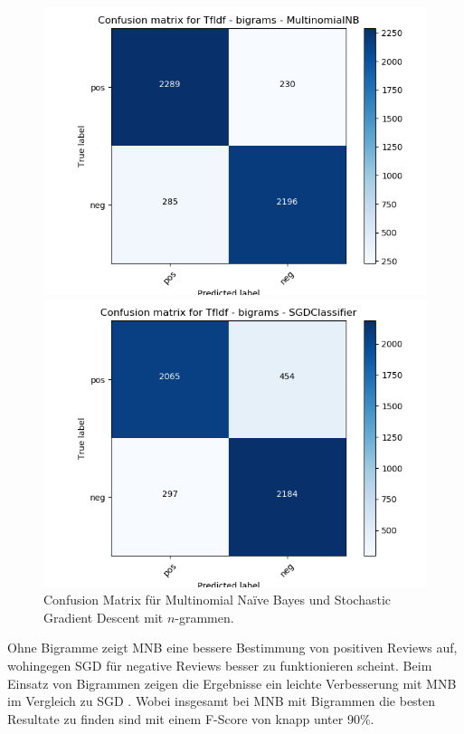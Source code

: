 \documentclass[12pt]{scrartcl}
\begin{document}
    \begin{figure}[h]
        \begin{minipage}{0.45\textwidth}
            \includegraphics[scale=.35]{pictures/tfidf_b_mnb.png}
        \end{minipage}
        \hfill
        \begin{minipage}{0.45\textwidth}
            \includegraphics[scale=.35]{pictures/tfidf_b_sgd.png}
        \end{minipage}
        \caption{Confusion Matrix für Multinomial Naïve Bayes und Stochastic Gradient Descent mit $n$-grammen.}
    \end{figure}

    Ohne Bigramme zeigt MNB eine bessere Bestimmung von positiven Reviews auf, wohingegen SGD für negative Reviews besser zu funktionieren scheint.
    Beim Einsatz von Bigrammen zeigen die Ergebnisse ein leichte Verbesserung mit MNB im Vergleich zu SGD .
    Wobei insgesamt bei MNB mit Bigrammen die besten Resultate zu finden sind mit einem F-Score von knapp unter 90\%.
\end{document}
